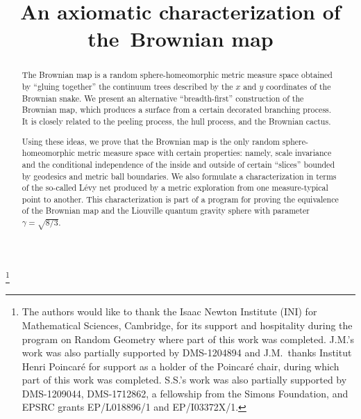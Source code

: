 \documentclass[JEP,XML,SOM,Unicode]{cedram}
\theoremstyle{plain}
\numberwithin{theorem}{section}
\theoremstyle{definition}
\begin{document}
\title{An axiomatic characterization of the~Brownian map}

\author[\initial{J.} \lastname{Miller}]{ }
\address{University of Cambridge, Statslab, DPMMS\\
Wilberforce Road, Cambridge CB3 0WB, UK}

\author[\initial{S.} \lastname{Sheffield}]{ }
\address{Department of Mathematics, MIT
77 Massachusetts Avenue
Cambridge, MA 02139, USA}

\thanks{The authors would like to thank the Isaac Newton Institute (INI) for Mathematical Sciences, Cambridge, for its support and hospitality during the program on Random Geometry where part of this work was completed. J.M.'s work was also partially supported by DMS-1204894 and J.M.\ thanks Institut Henri Poincaré for support as a holder of the Poincaré chair, during which part of this work was completed. S.S.'s work was also partially supported by DMS-1209044, DMS-1712862, a fellowship from the Simons Foundation, and EPSRC grants {EP/L018896/1} and {EP/I03372X/1}.}

\begin{abstract}
The Brownian map is a random sphere-homeomorphic metric measure space obtained by ``gluing together'' the continuum trees described by the $x$ and $y$ coordinates of the Brownian snake. We present an alternative ``breadth-first'' construction of the Brownian map, which produces a surface from a certain decorated branching process. It is closely related to the peeling process, the hull process, and the Brownian cactus.
\par
Using these ideas, we prove that the Brownian map is the only random sphere-homeomorphic metric measure space with certain properties: namely, scale invariance and the conditional independence of the inside and outside of certain ``slices'' bounded by geodesics and metric ball boundaries. We also formulate a characterization in terms of the so-called Lévy net produced by a metric exploration from one measure-typical point to another. This characterization is part of a program for proving the equivalence of the Brownian map and the Liouville quantum gravity sphere with parameter $\gamma= \sqrt{8/3}$.
\end{abstract}

\end{document}
